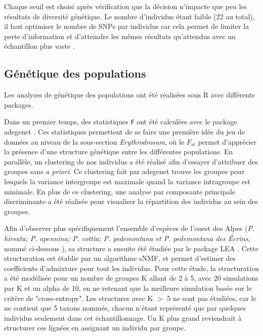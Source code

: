 Chaque seuil est choisi après vérification que la décision n'impacte que peu les résultats de diversité génétique.
 Le nombre d'individus étant faible (22 au total), il faut optimiser le nombre de SNPs par individus car cela permet de limiter la perte d'information et d'atteindre les mêmes résultats qu'attendus avec un échantillon plus vaste \citep{Nazareno2017}.


\subsection{Génétique des populations}

Les analyses de génétique des populations ont été réalisées sous R avec différents packages. 

Dans un premier temps, des statistiques \verb|F| ont été calculées avec le package adegenet \citep{Jombart2011}. Ces statistiques permettent de se faire une première idée du jeu de données au niveau de la sous-section \textit{Erythrodrosum}, où le $F_{st}$ permet d'apprécier la présence d'une structure génétique entre les différentes populations.
 En parallèle, un clustering de nos individus a été réalisé afin d'essayer d'attribuer des groupes sans \textit{a priori}. Ce clustering fait par adegenet trouve les groupes pour lesquels la variance intergroupe est maximale quand la variance intragroupe est minimale. En plus de ce clustering, une analyse par composante principale discriminante a été réalisée pour visualiser la répartition des individus au sein des groupes.

Afin d'observer plus spécifiquement l'ensemble d'espèces de l'ouest des Alpes (\textit{P. hirsuta; P. apennina; P. cottia; P. pedemontana et P. pedemontana des Écrins}, nommé ci-dessous ), sa structure a ensuite été étudiée par le package LEA \citep{Frichot2015}. Cette structuration est établie par un algorithme sNMF, et permet d'estimer des coefficients d'admixture pour tout les individus. Pour cette étude, la structuration a été modélisée pour un nombre de groupes K allant de 2 à 5, avec 20 simulations par K et un alpha de 10, en ne retenant que la meilleure simulation basée sur le critère de "cross-entropy". Les structures avec K $>$ 5 ne sont pas étudiées, car le  ne contient que 5 taxons nommés, chacun n'étant représenté que par quelques individus seulement dans cet échantillonnage. Un K plus grand reviendrait à structurer ces lignées en assignant un individu par  groupe.

